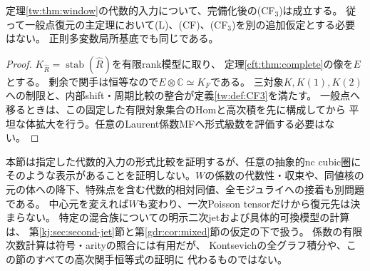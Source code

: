 \begin{corollary}[固定三対象の比較条件の充足]\label{cft:cor:CF3}
定理\ref{tw:thm:window}の代数的入力について、完備化後の(CF$_3$)は成立する。
従って一般点復元の主定理において(L)、(CF)、(CF$_3$)を別の追加仮定とする必要はない。
正則多変数局所基底でも同じである。
\end{corollary}
\begin{proof}
$K_{\widehat R}=\operatorname{stab}(\widehat R)$を有限rank模型に取り、
定理\ref{cft:thm:complete}の像を$E$とする。
剰余で関手は恒等なので$E\otimes\mathbb C\simeq K_F$である。
三対象$K,K(1),K(2)$への制限と、内部shift・周期比較の整合が定義\ref{tw:def:CF3}を満たす。
一般点へ移るときは、この固定した有限対象集合のHomと高次積を先に構成してから
平坦な体拡大を行う。任意のLaurent係数MFへ形式級数を評価する必要はない。
\end{proof}

\begin{remark}[射程と検証の境界]\label{cft:rem:scope}
本節は指定した代数的入力の形式比較を証明するが、任意の抽象的nc cubic圏に
そのような表示があることを証明しない。$W$の係数の代数性・収束や、同値核の
元の体への降下、特殊点を含む代数的相対同値、全モジュライへの接着も別問題である。
中心元を変えれば$W$も変わり、一次Poisson tensorだけから復元先は決まらない。
特定の混合族についての明示二次jetおよび具体的可換模型の計算は、
第\ref{kj:sec:second-jet}節と第\ref{gdr:cor:mixed}節の仮定の下で扱う。
係数の有限次数計算は符号・arityの照合には有用だが、
Kontsevichの全グラフ積分や、この節のすべての高次関手恒等式の証明に
代わるものではない。
\end{remark}
